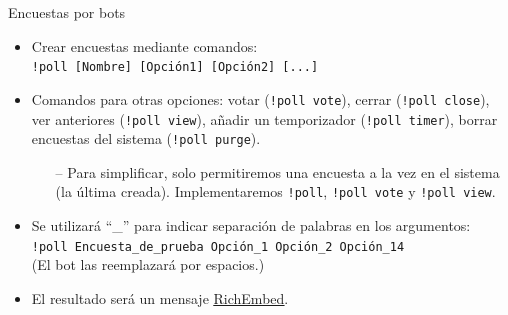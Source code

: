 \documentclass[10pt]{beamer} %
\begin{document}
\begin{frame}{Encuestas por bots}
    \begin{itemize}
        \item Crear encuestas mediante comandos:\\\texttt{!poll [Nombre] [Opción1] [Opción2] [...]}
        \item Comandos para otras opciones: votar (\texttt{!poll vote}), cerrar (\texttt{!poll close}), ver anteriores (\texttt{!poll view}), añadir un temporizador (\texttt{!poll timer}), borrar encuestas del sistema (\texttt{!poll purge}).
        \begin{itemize}
            \item[--] Para simplificar, solo permitiremos una encuesta a la vez en el sistema (la última creada). Implementaremos \texttt{!poll}, \texttt{!poll vote} y \texttt{!poll view}.
        \end{itemize}
        \item Se utilizará ``\_'' para indicar separación de palabras en los argumentos:\\\texttt{!poll Encuesta\_de\_prueba Opción\_1 Opción\_2 Opción\_14}\\
        (El bot las reemplazará por espacios.)
        \item El resultado será un mensaje \href{https://discord.js.org/\#/docs/main/stable/class/RichEmbed}{\underline{RichEmbed}}.
    \end{itemize}
\end{frame}
\end{document}

